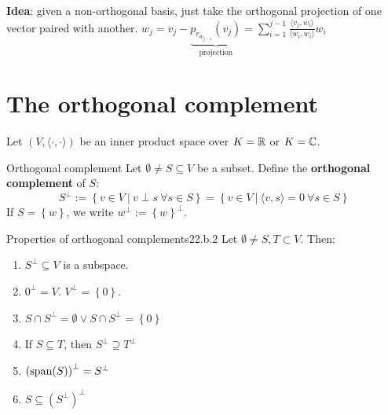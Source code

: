 \documentclass[12pt]{article}
\begin{document}
\textbf{Idea}: given a non-orthogonal basis, just take the orthogonal projection of one vector paired with another. $w_j = v_j - \underbrace{p_{r_{w_{j-1}}}(v_j)}_\text{projection} = \sum_{i = 1}^{j - 1} \frac{\langle v_j, w_i \rangle}{\langle w_i, w_i \rangle} w_i$

\section{The orthogonal complement}

Let $(V, \langle \cdot, \cdot \rangle)$ be an inner product space over $K = \mathbb{R}$ or $K = \mathbb{C}$.

\begin{definition}{Orthogonal complement}{}
    Let $\emptyset \neq S \subseteq V$ be a subset. Define the \textbf{orthogonal complement} of $S$:
    $$
        S^\perp := \left\{ v \in V \ |\ v \perp s \ \forall s \in S \right\} = \left\{ v \in V \ |\ \langle v, s \rangle = 0 \ \forall s \in S \right\}
    $$
    If $S = \left\{w\right\}$, we write $w^\perp := \left\{w\right\}^\perp$.
\end{definition}

\begin{lemma}{Properties of orthogonal complements}{22.b.2}
    Let $\emptyset \neq S, T \subset V$. Then:
    \begin{enumerate}
        \item $S^\perp \subseteq V$ is a subspace.
        \item $0^\perp = V$. $V^\perp = \left\{0\right\}$.
        \item $S \cap S^\perp = \emptyset \lor S \cap S^\perp = \left\{0\right\}$
        \item If $S \subseteq T$, then $S^\perp \supseteq T^\perp$
        \item $\left(\operatorname{span}(S)\right)^\perp = S^\perp$
        \item $S \subseteq (S^\perp)^\perp$
    \end{enumerate}
\end{lemma}
\end{document}
